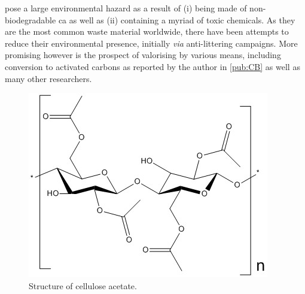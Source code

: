  pose a large environmental hazard as a result of (i) being made of non-biodegradable \acrfull{ca} as well as (ii) containing a myriad of toxic chemicals.\citep{Slaughter2011, Puls2011, chevalier2018nano} As they are the most common waste material worldwide, there have been attempts to reduce their environmental presence, initially \textit{via} anti-littering campaigns.\citep{Prevention2011, Harris2011} More promising however is the prospect of valorising  by various means, including conversion to activated carbons as reported by the author in \ref{pub:CB} as well as many other researchers.\citep{Soltani, Soltani2013, lima2018, xiong2019nitrogen, Lee2014, Hamzah2017, Yu2018, Wang2016a, Koochaki2019, Bilge2019}

\begin{figure}[h]
    \centering
    \includegraphics[width=0.7\columnwidth, keepaspectratio]{4-cbs/figs/cellulose_acetate.jpg}
    \caption{Structure of cellulose acetate.}
    \label{fig:cellulose acetate}
\end{figure}

